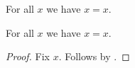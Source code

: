 \begin{axiom}\label{phase7_concurrent_later_axiom}
    For all $x$ we have $x = x$.
\end{axiom}

\begin{proposition}\label{phase7_concurrent_later_failure}
    For all $x$ we have $x = x$.
\end{proposition}
\begin{proof}
    Fix $x$.
    Follows by \auto.
\end{proof}
